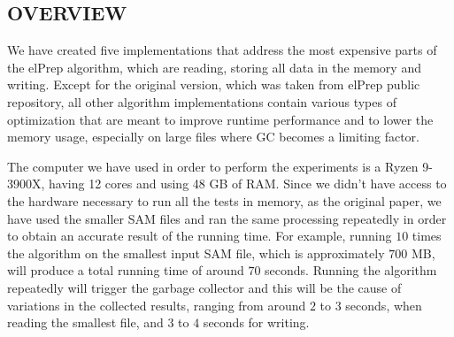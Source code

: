 \documentclass[a4paper,twoside]{article}
\begin{document}
\subsection{\uppercase{Overview}}
\label{subsec:overview}

We have created five implementations that address the most expensive parts of the elPrep algorithm, which are reading,  storing all data in the memory and writing.
Except for the original version, which was taken from elPrep public repository, all other algorithm implementations contain various types of optimization that are meant to improve runtime performance and to lower the memory usage, especially on large files where GC becomes a limiting factor. 
%
%
%
%
%


The computer we have used in order to perform the experiments is a Ryzen 9-3900X, having 12 cores and using 48 GB of RAM\@.
Since we didn't have access to the hardware necessary to run all the tests in memory, as the original paper, we have used the smaller SAM files and ran the same processing repeatedly in order to obtain an accurate result of the running time.
For example, running $10$ times the algorithm on the smallest input SAM file, which is approximately $700$ MB, will produce a total running time of around $70$ seconds. 
Running the algorithm repeatedly will trigger the garbage collector and this will be the cause of variations in the collected results, ranging from around $2$ to $3$ seconds, when reading the smallest file, and $3$ to $4$ seconds for writing.
\end{document}
